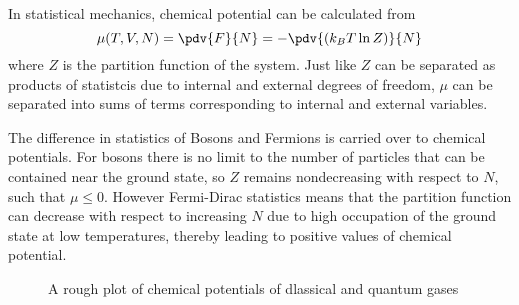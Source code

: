 \documentclass[12pt]{article}
\begin{document}
    In statistical mechanics, chemical potential can be calculated from \[
        \mu(T,V,N) = \pdv{F}{N} = - \pdv{ (k_BT \ln Z)}{N}
    \]
    where \(Z\) is the partition function of the system. Just like \(Z\) can be separated as products of statistcis due to internal and external degrees of freedom, \(\mu\) can be separated into sums of terms corresponding to internal and external variables.

    The difference in statistics of Bosons and Fermions is carried over to chemical potentials. For bosons there is no limit to the number of particles that can be contained near the ground state, so \(Z\) remains nondecreasing with respect to \(N\), such that \(\mu \leq 0\). However Fermi-Dirac statistics means that the partition function can decrease with respect to increasing \(N\) due to high occupation of the ground state at low temperatures, thereby leading to positive values of chemical potential.
    \begin{figure}[H]
        \centering
        \def\svgwidth{200pt}
        \caption{A rough plot of chemical potentials of dlassical and quantum gases}
    \end{figure}
    \newpage
    \section{}
\end{document}

